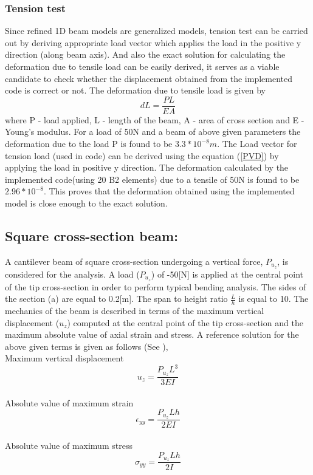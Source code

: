 \documentclass[a4paper,12pt]{article}
\begin{document}
\subsubsection*{Tension test}
\indent\indent\indent\indent Since refined 1D beam models are generalized models, tension test can be carried out by deriving appropriate load vector which applies the load in the positive y direction (along beam axis). And also the exact solution for calculating the deformation due to tensile load can be easily derived, it serves as a viable candidate to check whether the displacement obtained from the implemented code is correct or not. The deformation due to tensile load is given by 
\begin{equation}
dL = \frac{P L}{E A}
\label{exactdef}
\end{equation}
where P - load applied, L - length of the beam, A - area of cross section and E - Young's modulus. For a load of 50N and a beam of above given parameters the deformation due to the load P is found to be $3.3*10^{-8}m$. The Load vector for tension load (used in code) can be derived using the equation (\ref{PVD}) by applying the load in positive y direction. The deformation calculated by the implemented code(using 20 B2 elements) due to a tensile of 50N is found to be $2.96*10^{-8}$. This proves that the deformation obtained using the implemented model is close enough to the exact solution.
\newpage
\subsection*{Square cross-section beam:}
\indent\indent\indent\indent A cantilever beam of square cross-section undergoing a vertical force, $P_{u_{z}}$, is considered for the analysis. A load ($P_{u_{z}}$) of -50[N] is applied at the central point of the tip cross-section in order to perform typical bending analysis. The sides of the section (a) are equal to 0.2[m]. The span to height ratio $\frac{L}{h}$ is equal to 10. The mechanics of the beam is described in terms of the maximum vertical displacement ($u_{z}$) computed at the central point of the tip cross-section and the maximum absolute value of axial strain and stress. A reference solution for the above given terms is given as follows (See \cite{carrera2010refined}),\\
Maximum vertical displacement 
\begin{equation}
u_{z} = \frac{P_{u_{z}} L^{3}}{3 E I}
\label{u_z}
\end{equation}
\\
Absolute value of maximum strain
\begin{equation}
\epsilon_{yy} = \frac{P_{u_{z}} L h}{2 E I}
\label{eyy}
\end{equation}
\\
Absolute value of maximum stress
\begin{equation}
\sigma_{yy} = \frac{P_{u_{z}} L h}{2 I}
\label{syy}
\end{equation}
\end{document}
